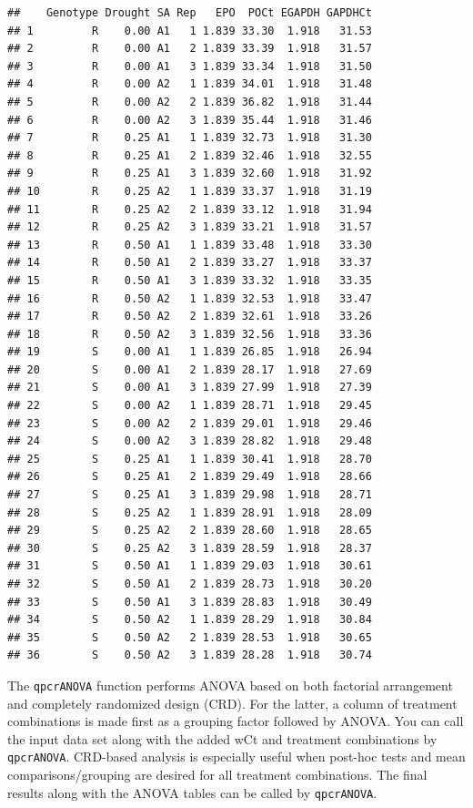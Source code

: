 \documentclass[
]{article}
\begin{document}
\begin{verbatim}
##    Genotype Drought SA Rep   EPO  POCt EGAPDH GAPDHCt
## 1         R    0.00 A1   1 1.839 33.30  1.918   31.53
## 2         R    0.00 A1   2 1.839 33.39  1.918   31.57
## 3         R    0.00 A1   3 1.839 33.34  1.918   31.50
## 4         R    0.00 A2   1 1.839 34.01  1.918   31.48
## 5         R    0.00 A2   2 1.839 36.82  1.918   31.44
## 6         R    0.00 A2   3 1.839 35.44  1.918   31.46
## 7         R    0.25 A1   1 1.839 32.73  1.918   31.30
## 8         R    0.25 A1   2 1.839 32.46  1.918   32.55
## 9         R    0.25 A1   3 1.839 32.60  1.918   31.92
## 10        R    0.25 A2   1 1.839 33.37  1.918   31.19
## 11        R    0.25 A2   2 1.839 33.12  1.918   31.94
## 12        R    0.25 A2   3 1.839 33.21  1.918   31.57
## 13        R    0.50 A1   1 1.839 33.48  1.918   33.30
## 14        R    0.50 A1   2 1.839 33.27  1.918   33.37
## 15        R    0.50 A1   3 1.839 33.32  1.918   33.35
## 16        R    0.50 A2   1 1.839 32.53  1.918   33.47
## 17        R    0.50 A2   2 1.839 32.61  1.918   33.26
## 18        R    0.50 A2   3 1.839 32.56  1.918   33.36
## 19        S    0.00 A1   1 1.839 26.85  1.918   26.94
## 20        S    0.00 A1   2 1.839 28.17  1.918   27.69
## 21        S    0.00 A1   3 1.839 27.99  1.918   27.39
## 22        S    0.00 A2   1 1.839 28.71  1.918   29.45
## 23        S    0.00 A2   2 1.839 29.01  1.918   29.46
## 24        S    0.00 A2   3 1.839 28.82  1.918   29.48
## 25        S    0.25 A1   1 1.839 30.41  1.918   28.70
## 26        S    0.25 A1   2 1.839 29.49  1.918   28.66
## 27        S    0.25 A1   3 1.839 29.98  1.918   28.71
## 28        S    0.25 A2   1 1.839 28.91  1.918   28.09
## 29        S    0.25 A2   2 1.839 28.60  1.918   28.65
## 30        S    0.25 A2   3 1.839 28.59  1.918   28.37
## 31        S    0.50 A1   1 1.839 29.03  1.918   30.61
## 32        S    0.50 A1   2 1.839 28.73  1.918   30.20
## 33        S    0.50 A1   3 1.839 28.83  1.918   30.49
## 34        S    0.50 A2   1 1.839 28.29  1.918   30.84
## 35        S    0.50 A2   2 1.839 28.53  1.918   30.65
## 36        S    0.50 A2   3 1.839 28.28  1.918   30.74
\end{verbatim}

The \texttt{qpcrANOVA} function performs ANOVA based on both factorial
arrangement and completely randomized design (CRD). For the latter, a
column of treatment combinations is made first as a grouping factor
followed by ANOVA. You can call the input data set along with the added
wCt and treatment combinations by \texttt{qpcrANOVA}. CRD-based analysis
is especially useful when post-hoc tests and mean comparisons/grouping
are desired for all treatment combinations. The final results along with
the ANOVA tables can be called by \texttt{qpcrANOVA}.
\end{document}
